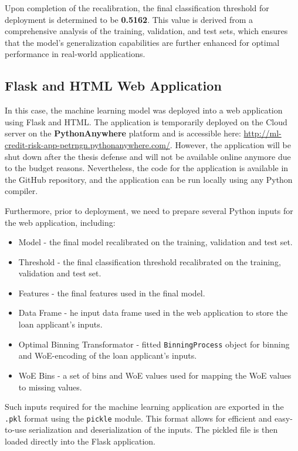 Upon completion of the recalibration, the final classification threshold for deployment is determined to be \textbf{0.5162}.
This value is derived from a comprehensive analysis of the training, validation, and test sets, which ensures that the model's generalization capabilities are further enhanced for optimal performance in real-world applications.

\subsection{Flask and HTML Web Application}

In this case, the machine learning model was deployed into a web application using Flask and HTML. The application is temporarily deployed on the Cloud server on the \textbf{PythonAnywhere} platform and is accessible here: \url{http://ml-credit-risk-app-petrngn.pythonanywhere.com/}.
However, the application will be shut down after the thesis defense and will not be available online anymore due to the budget reasons.
Nevertheless, the code for the application is available in the GitHub repository, and the application can be run locally using any Python compiler.

Furthermore, prior to deployment, we need to prepare several Python inputs for the web application, including:
\begin{itemize}\setlength\itemsep{0em}
    \item Model - the final model recalibrated on the training, validation and test set.
    \item Threshold - the final classification threshold recalibrated on the training, validation and test set.
    \item Features - the final features used in the final model.
    \item Data Frame - he input data frame used in the web application to store the loan applicant's inputs.
    \item Optimal Binning Transformator - fitted \lstinline{BinningProcess} object for binning and WoE-encoding of the loan applicant's inputs.
    \item WoE Bins - a set of bins and WoE values used for mapping the WoE values to missing values.
\end{itemize}

Such inputs required for the machine learning application are exported in the \lstinline{.pkl} format using the \lstinline{pickle} module. This format allows for efficient and easy-to-use serialization and deserialization of the inputs. The pickled file is then loaded directly into the Flask application.


